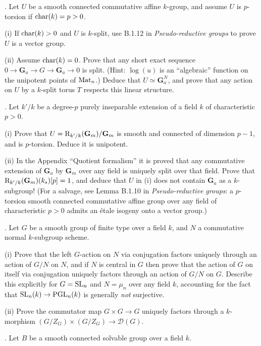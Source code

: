 \documentclass[10pt]{amsart}
\begin{document}
\medskip{}. Let $U$ be a smooth connected commutative affine $k$-group, 
and assume $U$ is $p$-torsion if ${\rm{char}}(k) = p > 0$.

(i) If ${\rm{char}}(k) > 0$ and $U$ is $k$-split, use B.1.12 in {\em Pseudo-reductive groups} to prove 
$U$ is a vector group.  

(ii) Assume ${\rm{char}}(k) = 0$. Prove that any short exact sequence $0 \rightarrow
\mathbf{G}_a \rightarrow G \rightarrow \mathbf{G}_a \rightarrow 0$
is split.  (Hint: $\log(u)$ is an ``algebraic'' function on the unipotent points of
${\rm{Mat}}_n$.) Deduce that $U \simeq \mathbf{G}_a^N$, and prove that any action on
$U$ by a $k$-split torus $T$ respects this linear structure.

\medskip{}. Let $k'/k$ be a degree-$p$ purely inseparable extension of a field $k$ of characteristic $p > 0$.

(i) Prove that $U= {\rm{R}}_{k'/k}(\mathbf{G}_m)/\mathbf{G}_m$ is smooth and connected 
of dimension $p-1$, and is $p$-torsion.  Deduce it is unipotent.   

(ii) In the Appendix ``Quotient formalism'' it is proved that any commutative extension of
$\mathbf{G}_a$ by $\mathbf{G}_m$ over any field is uniquely split over that field.
Prove that ${\rm{R}}_{k'/k}(\mathbf{G}_m)(k_s)[p] = 1$, and 
deduce that $U$ in (i) does not contain $\mathbf{G}_a$ as a $k$-subgroup!  (For a salvage, see Lemma B.1.10
in {\em Pseudo-reductive groups}:  a $p$-torsion smooth connected commutative affine group over
any field of characteristic $p > 0$ admits an \'etale isogeny onto a vector group.) 

\medskip{}. Let $G$ be a smooth group of finite type over a field $k$, and $N$ a commutative normal $k$-subgroup scheme. 

(i) Prove that the left $G$-action on $N$ via conjugation factors uniquely through 
an action of $G/N$ on $N$, and if $N$ is central in $G$ then prove that the action of $G$ on itself
via conjugation uniquely factors through an action of $G/N$ on $G$.  Describe this explicitly for $G = {\rm{SL}}_n$
and $N = \mu_n$ over any field $k$, accounting for the fact that ${\rm{SL}}_n(k) \rightarrow {\rm{PGL}}_n(k)$ is 
generally {\em not} surjective. 

(ii) Prove the commutator map $G \times G \rightarrow G$ uniquely factors through
a $k$-morphism $(G/Z_G) \times (G/Z_G) \rightarrow \mathcal{D}(G)$.

\medskip{}.  Let $B$ be a smooth connected solvable group over a field $k$.
\end{document}
